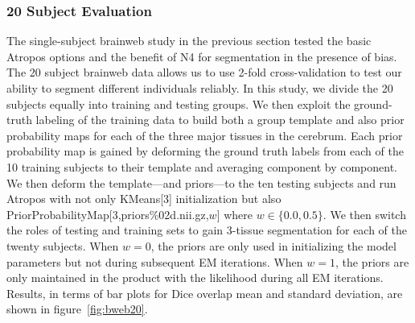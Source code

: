 \documentclass[11pt,english]{article}
\begin{document}
\subsubsection{20 Subject Evaluation} The single-subject brainweb
study in the previous section tested the basic Atropos options and the
benefit of N4 for segmentation in the presence of bias.  The 20
subject brainweb data allows us to use 2-fold cross-validation to test
our ability to segment different individuals reliably.  In this study,
we divide the 20 subjects equally into training and testing groups.
We then exploit the ground-truth labeling of the training data to
build both a group template \citep{Avants2010} and also prior
probability maps for each of the three major tissues in the cerebrum.
Each prior probability map is gained by deforming the ground truth
labels from each of the 10 training subjects to their template and
averaging component by component.  We then deform the template---and
priors---to the ten testing subjects and run Atropos with not only
{\ttfamily KMeans[3]} initialization but also {\ttfamily
  PriorProbabilityMap[3,priors\%02d.nii.gz,$w$] } where $w \in
\{0.0,0.5\}$.  We then switch the roles of testing and training sets to
gain 3-tissue segmentation for each of the twenty subjects.  
When $w=0$, the priors are only used in initializing
the model parameters but not during subsequent EM iterations.  
When $w=1$, the priors are only maintained in the product with the
likelihood during all EM iterations.  Results, in terms of bar
plots for Dice overlap mean and standard deviation, are shown in figure~\ref{fig:bweb20}.
\end{document}
